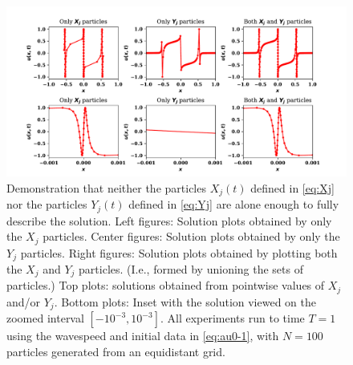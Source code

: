 \documentclass[11pt]{amsart}
\begin{document}
\begin{figure}
  \includegraphics[width=\textwidth]{particle-plot.pdf}
  \caption{Demonstration that neither the particles $X_j(t)$ defined in \eqref{eq:Xj} nor the particles $Y_j(t)$ defined in \eqref{eq:Yj} are alone enough to fully describe the solution. Left figures: Solution plots obtained by only the $X_j$ particles. Center figures: Solution plots obtained by only the $Y_j$ particles. Right figures: Solution plots obtained by plotting both the $X_j$ and $Y_j$ particles. (I.e., formed by unioning the sets of particles.) Top plots: solutions obtained from pointwise values of $X_j$ and/or $Y_j$. Bottom plots: Inset with the solution viewed on the zoomed interval $[-10^{-3}, 10^{-3}]$. All experiments run to time $T = 1$ using the wavespeed and initial data in \eqref{eq:au0-1}, with $N = 100$ particles generated from an equidistant grid.}\label{fig:f1}
\end{figure}
\end{document}
